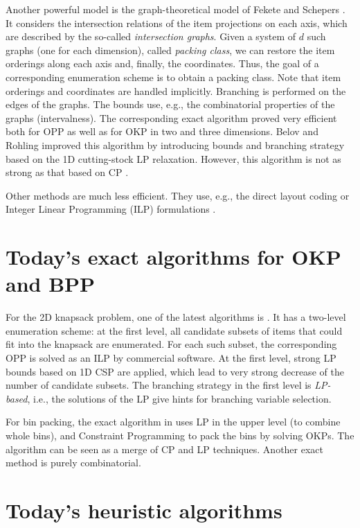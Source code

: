 \documentclass[a4paper,12pt]{article}
\begin{document}
Another powerful model is the graph-theoretical model of Fekete and Schepers \cite{FekExact}. It considers the intersection relations of the item projections on each axis, which are described by the so-called \emph{intersection graphs}. Given a system of $d$ such graphs (one for each dimension), called \emph{packing class}, we can restore the item orderings along each axis and, finally, the coordinates. Thus, the goal of a corresponding enumeration scheme is to obtain a packing class. Note that item orderings and coordinates are handled implicitly. Branching is performed on the edges of the graphs. The bounds use, e.g., the combinatorial properties of the graphs (intervalness). The corresponding exact algorithm \cite{FekExactLarge} proved very efficient both for OPP as well as for OKP in two and three dimensions. Belov and Rohling \cite{BR09} improved this algorithm by introducing bounds and branching strategy based on the 1D cutting-stock LP relaxation. However, this algorithm is not as strong as that based on CP \cite{ClaConstr}.

Other methods are much less efficient. They use, e.g., the direct layout coding \cite{MMV03,SPPExactAlvarez} or Integer Linear Programming (ILP) formulations \cite{Pad00,Baldacci07}.

\section{Today's exact algorithms for OKP and BPP}

For the 2D knapsack problem, one of the latest algorithms is \cite{Baldacci07}. It has a two-level enumeration scheme: at the first level, all candidate subsets of items that could fit into the knapsack are enumerated. For each such subset, the corresponding OPP is solved as an ILP by commercial software. At the first level, strong LP bounds based on 1D CSP are applied, which lead to very strong decrease of the number of candidate subsets. The branching strategy in the first level is \emph{LP-based}, i.e., the solutions of the LP give hints for branching variable selection.

For bin packing, the exact algorithm in \cite{PisBPP07} uses LP in the upper level (to combine whole bins), and Constraint Programming to pack the bins by solving OKPs. The algorithm can be seen as a merge of CP and LP techniques. Another exact method \cite{ClaBPPExact} is purely combinatorial.

\section{Today's heuristic algorithms}\nopagebreak
\end{document}
